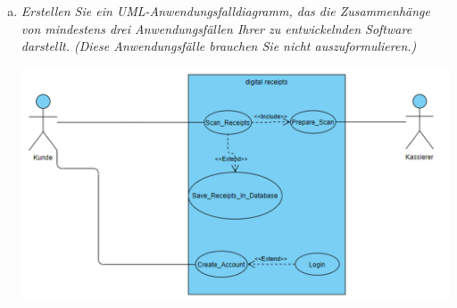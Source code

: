 \begin{enumerate}[a)]
    
\newpage
    \item \itshape{Erstellen Sie ein UML-Anwendungsfalldiagramm, das die Zusammenhänge von mindestens drei Anwendungsfällen Ihrer zu entwickelnden Software darstellt. (Diese Anwendungsfälle brauchen Sie nicht auszuformulieren.)}
    \begin{enumerate}
        \centering
        \includegraphics[scale=0.55,keepaspectratio]{"src/u5/UML_Usecase.PNG"}
    \end{enumerate}
    
    
    
\end{enumerate}


